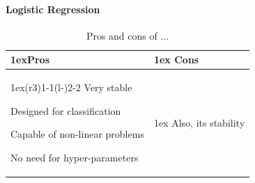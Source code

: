 \documentclass{article}
\begin{document}
        \paragraph{Logistic Regression}
        \begin{table}
        \begin{tabularx}{\linewidth}{>{\parskip1ex}X@{\kern4\tabcolsep}>{\parskip1ex}X}
        \toprule
        \hfil\bfseries Pros
        &
        \hfil\bfseries Cons
        \\\cmidrule(r{3\tabcolsep}){1-1}\cmidrule(l{-\tabcolsep}){2-2}
        Very stable\par
        Designed for classification\par
        Capable of non-linear problems\par
        No need for hyper-parameters\par
        &
        Also, its stability\par
        \\\bottomrule
        \end{tabularx}
        \caption{Pros and cons of ...}
        \end{table}
\end{document}
